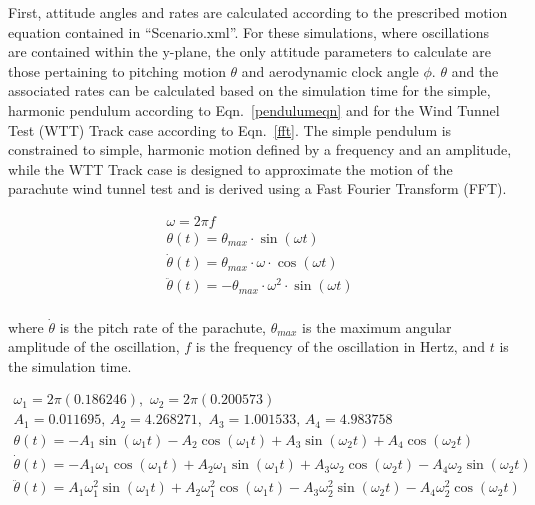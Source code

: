 \documentclass[]{aiaa-tc}%
\begin{document}
First, attitude angles and rates are calculated according to the prescribed motion equation contained in ``Scenario.xml''.  For these simulations, where oscillations are contained within the y-plane, the only attitude parameters to calculate are those pertaining to pitching motion $\theta$ and aerodynamic clock angle $\phi$.  $\theta$ and the associated rates can be calculated based on the simulation time for the simple, harmonic pendulum according to Eqn.~\ref{pendulumeqn} and for the Wind Tunnel Test (WTT) Track case according to Eqn.~\ref{fft}.  The simple pendulum is constrained to simple, harmonic motion defined by a frequency and an amplitude, while the WTT Track case is designed to approximate the motion of the parachute wind tunnel test and is derived using a Fast Fourier Transform (FFT).

\begin{equation} \label{pendulumeqn}
\begin{gathered}
\omega =  2\pi f \\
\theta(t) = \theta_{max} \cdot \sin(\omega t) \\
\dot{\theta}(t) = \theta_{max} \cdot  \omega \cdot \cos(\omega t) \\
\ddot{\theta}(t) = -\theta_{max} \cdot  \omega^2 \cdot \sin(\omega t) \\
\end{gathered}
\end{equation}

\noindent where $\dot{\theta}$ is the pitch rate of the parachute, $\theta_{max}$ is the maximum angular amplitude of the oscillation, $f$ is the frequency of the oscillation in Hertz, and $t$ is the simulation time.

\begin{equation}
\begin{gathered}
\omega_1 = 2\pi(0.186246),\,\,\omega_2 = 2\pi(0.200573) \\
A_1 = 0.011695,\,A_2 = 4.268271,\,\,A_3 = 1.001533,\,A_4 = 4.983758 \\
\theta(t) =        - A_1 \sin(\omega_1 t)
                   - A_2 \cos(\omega_1 t)
                   + A_3 \sin(\omega_2 t)
                   + A_4 \cos(\omega_2 t) \\
\dot{\theta}(t) =  - A_1 \omega_1 \cos(\omega_1 t)
                   + A_2 \omega_1 \sin(\omega_1 t)
                   + A_3 \omega_2 \cos(\omega_2 t)
                   - A_4 \omega_2 \sin(\omega_2 t) \\
\ddot{\theta}(t) =   A_1 \omega_1^2 \sin(\omega_1 t)
                   + A_2 \omega_1^2 \cos(\omega_1 t)
                   - A_3 \omega_2^2 \sin(\omega_2 t)
                   - A_4 \omega_2^2 \cos(\omega_2 t) \\
\end{gathered}
\label{fft}
\end{equation}
\end{document}
